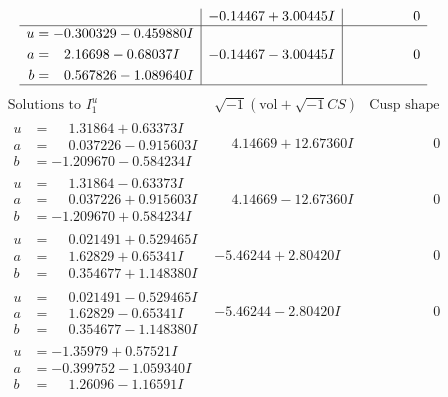 \documentclass[1p]{elsarticle_modified}
\theoremstyle{definition}
\newcommand{\I}{\sqrt{-1}}
\begin{document}
$$\begin{array}{c|c|c}
 & -0.14467 + 3.00445 I & \phantom{-0.000000 } 0 \\ \hline\begin{aligned}
u &= -0.300329 - 0.459880 I \\
a &= \phantom{-}2.16698 - 0.68037 I \\
b &= \phantom{-}0.567826 - 1.089640 I\end{aligned}
 & -0.14467 - 3.00445 I & \phantom{-0.000000 } 0\\
 \hline 
 \end{array}$$\newpage$$\begin{array}{c|c|c}  
\text{Solutions to }I^u_{1}& \I (\text{vol} + \sqrt{-1}CS) & \text{Cusp shape}\\
 \hline 
\begin{aligned}
u &= \phantom{-}1.31864 + 0.63373 I \\
a &= \phantom{-}0.037226 - 0.915603 I \\
b &= -1.209670 - 0.584234 I\end{aligned}
 & \phantom{-}4.14669 + 12.67360 I & \phantom{-0.000000 } 0 \\ \hline\begin{aligned}
u &= \phantom{-}1.31864 - 0.63373 I \\
a &= \phantom{-}0.037226 + 0.915603 I \\
b &= -1.209670 + 0.584234 I\end{aligned}
 & \phantom{-}4.14669 - 12.67360 I & \phantom{-0.000000 } 0 \\ \hline\begin{aligned}
u &= \phantom{-}0.021491 + 0.529465 I \\
a &= \phantom{-}1.62829 + 0.65341 I \\
b &= \phantom{-}0.354677 + 1.148380 I\end{aligned}
 & -5.46244 + 2.80420 I & \phantom{-0.000000 } 0 \\ \hline\begin{aligned}
u &= \phantom{-}0.021491 - 0.529465 I \\
a &= \phantom{-}1.62829 - 0.65341 I \\
b &= \phantom{-}0.354677 - 1.148380 I\end{aligned}
 & -5.46244 - 2.80420 I & \phantom{-0.000000 } 0 \\ \hline\begin{aligned}
u &= -1.35979 + 0.57521 I \\
a &= -0.399752 - 1.059340 I \\
b &= \phantom{-}1.26096 - 1.16591 I\end{aligned}

\end{array}$$
\end{document}
